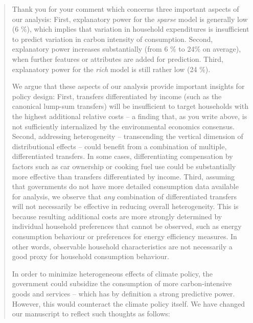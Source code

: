 \documentclass[11pt]{article}
\newenvironment{response}
{\begin{quote}\color{black}}
{\end{quote}}
\begin{document}
\begin{response}
    Thank you for your comment which concerns three important aspects of our analysis: First, explanatory power for the \textit{sparse} model is generally low (6 \%), which implies that variation in household expenditures is insufficient to predict variation in carbon intensity of consumption. Second, explanatory power increases substantially (from 6 \% to 24\% on average), when further features or attributes are added for prediction. Third, explanatory power for the \textit{rich} model is still rather low (24 \%).

    We argue that these aspects of our analysis provide important insights for policy design: First, transfers differentiated by income (such as the canonical lump-sum transfers) will be insufficient to target households with the highest additional relative costs -- a finding that, as you write above, is not sufficiently internalized by the environmental economics consensus. Second, addressing heterogeneity -- transcending the vertical dimension of distributional effects -- could benefit from a combination of multiple, differentiated transfers. In some cases, differentiating compensation by factors such as car ownership or cooking fuel use could be substantially more effective than transfers differentiated by income. Third, assuming that governments do not have more detailed consumption data available for analysis, we observe that \textit{any} combination of differentiated transfers will not necessarily be effective in reducing overall heterogeneity. This is because resulting additional costs are more strongly determined by individual household preferences that cannot be observed, such as energy consumption behaviour or preferences for energy efficiency measures. In other words, observable household characteristics are not necessarily a good proxy for household consumption behaviour. 

    In order to minimize heterogeneous effects of climate policy, the government could subsidize the consumption of more carbon-intensive goods and services -- which has by definition a strong predictive power. However, this would counteract the climate policy itself. We have changed our manuscript to reflect such thoughts as follows:

\end{response}
\end{document}
